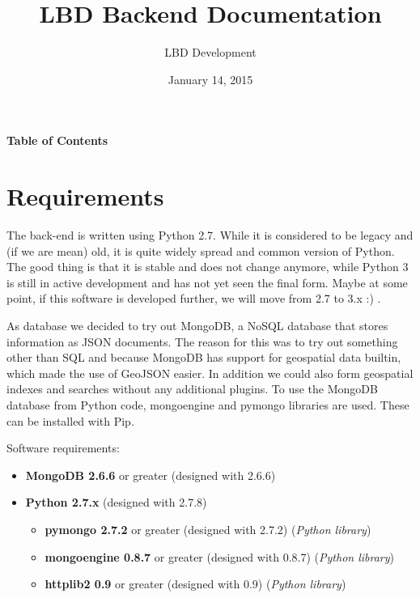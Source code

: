 \documentclass[letterpaper,10pt,english]{sphinxmanual}
\title{LBD Backend Documentation}
\date{January 14, 2015}
\author{LBD Development}
\begin{document}
\maketitle
\tableofcontents
{}\label{index::doc}


\textbf{Table of Contents}


\chapter{Requirements}
\label{requirements:requirements}\label{requirements::doc}\label{requirements:welcome-to-lbd-backend-s-documentation}
The back-end is written using Python 2.7. While it is considered to be legacy and (if we are mean) old, it is quite
widely spread and common version of Python. The good thing is that it is stable and does not change anymore, while
Python 3 is still in active development and has not yet seen the final form. Maybe at some point, if this software
is developed further, we will move from 2.7 to 3.x :) .

As database we decided to try out MongoDB, a NoSQL database that stores information as JSON documents. The reason for
this was to try out something other than SQL and because MongoDB has support for geospatial data builtin, which made
the use of GeoJSON easier. In addition we could also form geospatial indexes and searches without any additional
plugins. To use the MongoDB database from Python code, mongoengine and pymongo libraries are used. These can be installed
with Pip.

Software requirements:
\begin{itemize}
\item {} 
\textbf{MongoDB 2.6.6} or greater (designed with 2.6.6)

\item {} 
\textbf{Python 2.7.x} (designed with 2.7.8)
\begin{itemize}
\item {} 
\textbf{pymongo 2.7.2} or greater (designed with 2.7.2) (\emph{Python library})

\item {} 
\textbf{mongoengine 0.8.7} or greater (designed with 0.8.7) (\emph{Python library})

\item {} 
\textbf{httplib2 0.9} or greater (designed with 0.9) (\emph{Python library})

\end{itemize}

\end{itemize}
\end{document}
